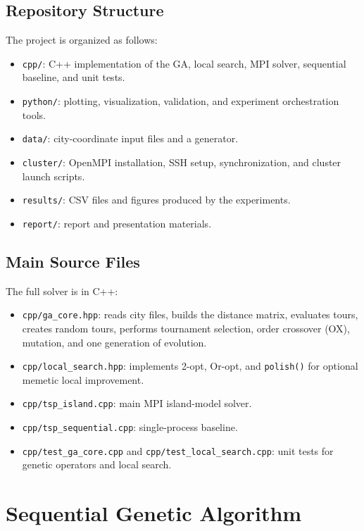 \documentclass[11pt,a4paper]{article}
\begin{document}
\subsection{Repository Structure}
The project is organized as follows:

\begin{itemize}[leftmargin=*]
  \item \texttt{cpp/}: C++ implementation of the GA, local search, MPI solver,
  sequential baseline, and unit tests.
  \item \texttt{python/}: plotting, visualization, validation, and experiment
  orchestration tools.
  \item \texttt{data/}: city-coordinate input files and a generator.
  \item \texttt{cluster/}: OpenMPI installation, SSH setup, synchronization, and
  cluster launch scripts.
  \item \texttt{results/}: CSV files and figures produced by the experiments.
  \item \texttt{report/}: report and presentation materials.
\end{itemize}

\subsection{Main Source Files}
The full solver is in C++:

\begin{itemize}[leftmargin=*]
  \item \texttt{cpp/ga\_core.hpp}: reads city files, builds the distance matrix,
  evaluates tours, creates random tours, performs tournament selection, order
  crossover (OX), mutation, and one generation of evolution.
  \item \texttt{cpp/local\_search.hpp}: implements 2-opt, Or-opt, and
  \texttt{polish()} for optional memetic local improvement.
  \item \texttt{cpp/tsp\_island.cpp}: main MPI island-model solver.
  \item \texttt{cpp/tsp\_sequential.cpp}: single-process baseline.
  \item \texttt{cpp/test\_ga\_core.cpp} and \texttt{cpp/test\_local\_search.cpp}:
  unit tests for genetic operators and local search.
\end{itemize}

\section{Sequential Genetic Algorithm}
\end{document}
